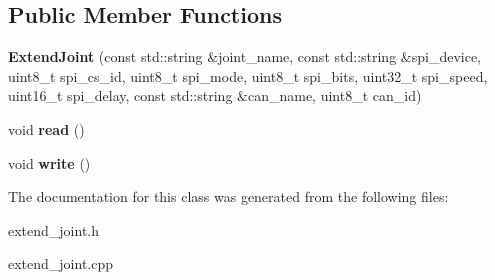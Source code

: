 \subsection*{Public Member Functions}
\begin{DoxyCompactItemize}
\item 
\mbox{\label{classExtendJoint_a115a7b5763d4496e9c365614241b2351}} 
{\bfseries Extend\+Joint} (const std\+::string \&joint\+\_\+name, const std\+::string \&spi\+\_\+device, uint8\+\_\+t spi\+\_\+cs\+\_\+id, uint8\+\_\+t spi\+\_\+mode, uint8\+\_\+t spi\+\_\+bits, uint32\+\_\+t spi\+\_\+speed, uint16\+\_\+t spi\+\_\+delay, const std\+::string \&can\+\_\+name, uint8\+\_\+t can\+\_\+id)
\item 
\mbox{\label{classExtendJoint_a703426ab8a4047bb7a6087ffff734b5d}} 
void {\bfseries read} ()
\item 
\mbox{\label{classExtendJoint_aaaddc50f230254a001ce8b3f56064371}} 
void {\bfseries write} ()
\end{DoxyCompactItemize}


The documentation for this class was generated from the following files\+:\begin{DoxyCompactItemize}
\item 
extend\+\_\+joint.\+h\item 
extend\+\_\+joint.\+cpp\end{DoxyCompactItemize}
